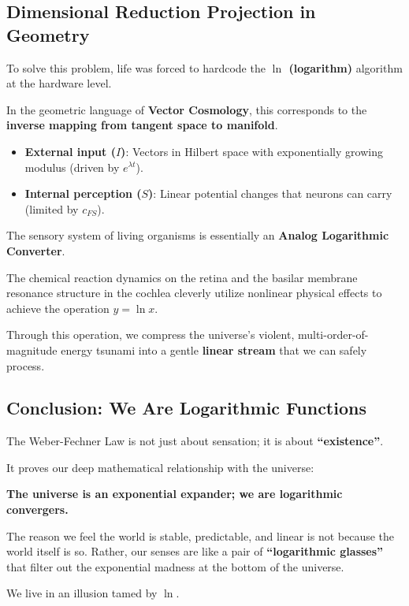 \subsection{Dimensional Reduction Projection in Geometry}

To solve this problem, life was forced to hardcode the \textbf{$\ln$ (logarithm)} algorithm at the hardware level.

In the geometric language of \textbf{Vector Cosmology}, this corresponds to the \textbf{inverse mapping from tangent space to manifold}.

\begin{itemize}
\item \textbf{External input ($I$)}: Vectors in Hilbert space with exponentially growing modulus (driven by $e^{\lambda t}$).

\item \textbf{Internal perception ($S$)}: Linear potential changes that neurons can carry (limited by $c_{FS}$).
\end{itemize}

The sensory system of living organisms is essentially an \textbf{Analog Logarithmic Converter}.

The chemical reaction dynamics on the retina and the basilar membrane resonance structure in the cochlea cleverly utilize nonlinear physical effects to achieve the operation $y = \ln x$.

Through this operation, we compress the universe's violent, multi-order-of-magnitude energy tsunami into a gentle \textbf{linear stream} that we can safely process.

\subsection{Conclusion: We Are Logarithmic Functions}

The Weber-Fechner Law is not just about sensation; it is about \textbf{``existence''}.

It proves our deep mathematical relationship with the universe:

\textbf{The universe is an exponential expander; we are logarithmic convergers.}

The reason we feel the world is stable, predictable, and linear is not because the world itself is so. Rather, our senses are like a pair of \textbf{``logarithmic glasses''} that filter out the exponential madness at the bottom of the universe.

We live in an illusion tamed by $\ln$.

